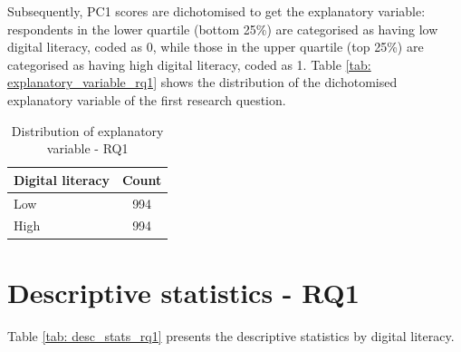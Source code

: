 Subsequently, PC1 scores are dichotomised to get the explanatory variable: respondents in the lower quartile (bottom 25\%) are categorised as having low digital literacy, coded as 0, while those in the upper quartile (top 25\%) are categorised as having high digital literacy, coded as 1. Table \ref{tab: explanatory_variable_rq1} shows the distribution of the dichotomised explanatory variable of the first research question.

\begin{table}[h!]
    \centering
    \caption{Distribution of explanatory variable - RQ1}
    \label{tab:explanatory_variable_rq1}
    \begin{tabular}{lc}
        \toprule
        Digital literacy & Count \\
        \midrule
        Low & 994 \\
        High & 994 \\
        \bottomrule
    \end{tabular}
\end{table}

\section{Descriptive statistics - RQ1}
Table \ref{tab: desc_stats_rq1} presents the descriptive statistics by digital literacy. 

